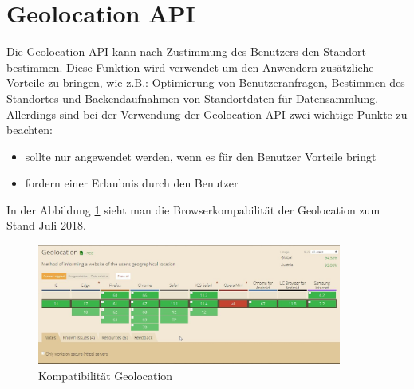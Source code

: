 \section{Geolocation API}
Die Geolocation API kann nach Zustimmung des Benutzers den Standort bestimmen. Diese Funktion wird verwendet  um den Anwendern zusätzliche Vorteile zu bringen, wie z.B.: Optimierung von Benutzeranfragen, Bestimmen des Standortes und Backendaufnahmen von Standortdaten für Datensammlung. 
Allerdings sind bei der Verwendung der Geolocation-API zwei wichtige Punkte zu beachten:

\begin{itemize}
    \item  sollte nur angewendet werden, wenn es für den Benutzer Vorteile bringt 
	\item  fordern einer Erlaubnis durch den Benutzer  
\end{itemize}




In der Abbildung \ref{fig:BrowserGL} sieht man die Browserkompabilität der Geolocation zum Stand Juli 2018.
\begin{figure}[H]
	\centering
	\includegraphics[width=10cm]{BilderAllgemein/BrowserGL}\medskip
	\caption{Kompatibilität Geolocation \cite{BrowserSupport}}
	\label{fig:BrowserGL}
\end{figure}









